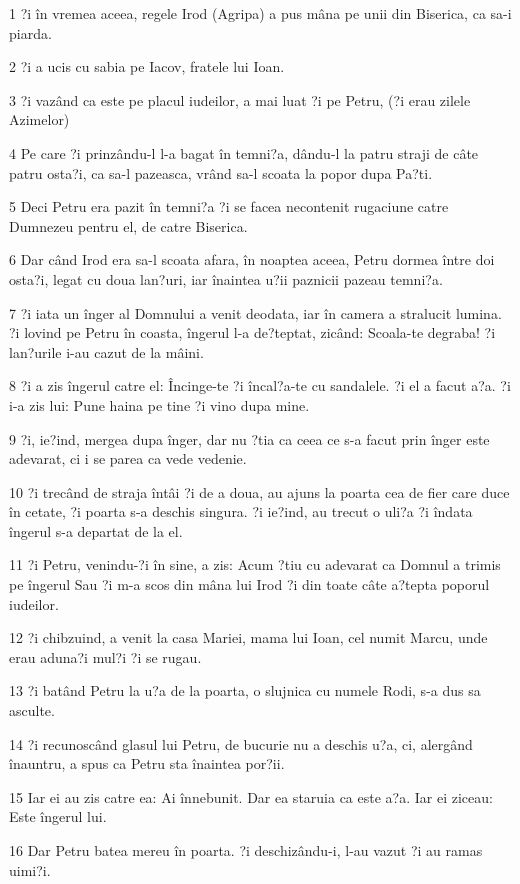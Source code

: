 \par 1 ?i în vremea aceea, regele Irod (Agripa) a pus mâna pe unii din Biserica, ca sa-i piarda.
\par 2 ?i a ucis cu sabia pe Iacov, fratele lui Ioan.
\par 3 ?i vazând ca este pe placul iudeilor, a mai luat ?i pe Petru, (?i erau zilele Azimelor)
\par 4 Pe care ?i prinzându-l l-a bagat în temni?a, dându-l la patru straji de câte patru osta?i, ca sa-l pazeasca, vrând sa-l scoata la popor dupa Pa?ti.
\par 5 Deci Petru era pazit în temni?a ?i se facea necontenit rugaciune catre Dumnezeu pentru el, de catre Biserica.
\par 6 Dar când Irod era sa-l scoata afara, în noaptea aceea, Petru dormea între doi osta?i, legat cu doua lan?uri, iar înaintea u?ii paznicii pazeau temni?a.
\par 7 ?i iata un înger al Domnului a venit deodata, iar în camera a stralucit lumina. ?i lovind pe Petru în coasta, îngerul l-a de?teptat, zicând: Scoala-te degraba! ?i lan?urile i-au cazut de la mâini.
\par 8 ?i a zis îngerul catre el: Încinge-te ?i încal?a-te cu sandalele. ?i el a facut a?a. ?i i-a zis lui: Pune haina pe tine ?i vino dupa mine.
\par 9 ?i, ie?ind, mergea dupa înger, dar nu ?tia ca ceea ce s-a facut prin înger este adevarat, ci i se parea ca vede vedenie.
\par 10 ?i trecând de straja întâi ?i de a doua, au ajuns la poarta cea de fier care duce în cetate, ?i poarta s-a deschis singura. ?i ie?ind, au trecut o uli?a ?i îndata îngerul s-a departat de la el.
\par 11 ?i Petru, venindu-?i în sine, a zis: Acum ?tiu cu adevarat ca Domnul a trimis pe îngerul Sau ?i m-a scos din mâna lui Irod ?i din toate câte a?tepta poporul iudeilor.
\par 12 ?i chibzuind, a venit la casa Mariei, mama lui Ioan, cel numit Marcu, unde erau aduna?i mul?i ?i se rugau.
\par 13 ?i batând Petru la u?a de la poarta, o slujnica cu numele Rodi, s-a dus sa asculte.
\par 14 ?i recunoscând glasul lui Petru, de bucurie nu a deschis u?a, ci, alergând înauntru, a spus ca Petru sta înaintea por?ii.
\par 15 Iar ei au zis catre ea: Ai înnebunit. Dar ea staruia ca este a?a. Iar ei ziceau: Este îngerul lui.
\par 16 Dar Petru batea mereu în poarta. ?i deschizându-i, l-au vazut ?i au ramas uimi?i.
